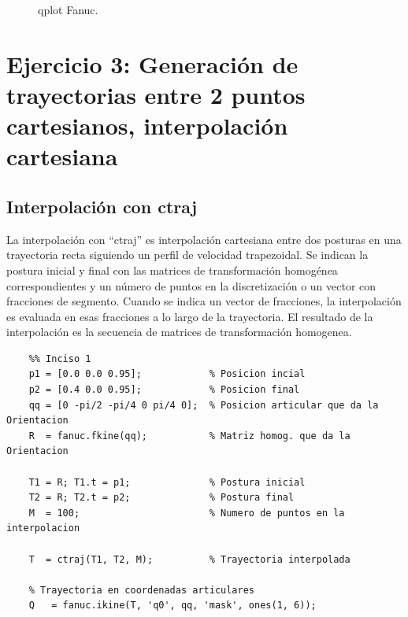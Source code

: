 \documentclass[a4paper,12pt]{article}
\begin{document}
\begin{figure}[H]
    \centering
    \begin{adjustbox}{scale = 0.65, max width=\columnwidth}
    \end{adjustbox}
    \caption{qplot Fanuc.}
    \label{qplot fanuc}
\end{figure}

\section{Ejercicio 3:  Generación de trayectorias entre 2 puntos cartesianos, interpolación cartesiana}
\subsection{Interpolación con ctraj}
La interpolación con ``ctraj'' es interpolación cartesiana entre dos posturas en una trayectoria recta siguiendo un perfil de velocidad trapezoidal.
Se indican la postura inicial y final con las matrices de transformación homogénea correspondientes y un número de puntos
en la discretización o un vector con fracciones de segmento.
Cuando se indica un vector de fracciones, la interpolación es evaluada 
en esas fracciones a lo largo de la trayectoria.
El resultado de la interpolación es la secuencia de matrices de transformación homogenea.

\begin{lstlisting}
    %% Inciso 1
    p1 = [0.0 0.0 0.95];            % Posicion incial
    p2 = [0.4 0.0 0.95];            % Posicion final
    qq = [0 -pi/2 -pi/4 0 pi/4 0];  % Posicion articular que da la Orientacion
    R  = fanuc.fkine(qq);           % Matriz homog. que da la Orientacion

    T1 = R; T1.t = p1;              % Postura inicial
    T2 = R; T2.t = p2;              % Postura final
    M  = 100;                       % Numero de puntos en la interpolacion

    T  = ctraj(T1, T2, M);          % Trayectoria interpolada

    % Trayectoria en coordenadas articulares
    Q   = fanuc.ikine(T, 'q0', qq, 'mask', ones(1, 6));
\end{lstlisting}
\end{document}
